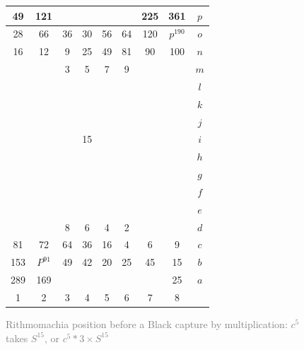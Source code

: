 \documentclass[12pt]{article}
\begin{document}
\begin{figure}[h!] 
\centering 
\begin{tabular}{|c|c|c|c|c|c|c|c||c} \hline
\squadfill{\,}49 & \squadfill{\,}121 & \quad  & \quad  & \quad  & \quad  & \squadfill{\,}225 & \squadfill{\,}361 & $p$ \\ \hline
\squadfill{\,}28 & \squadfill{\,}66 & \trianglepafill{\,}36 & \trianglepafill{\,}30 & \trianglepafill{\,}56 & \trianglepafill{\,}64 & \squadfill{\,}120 & \rhombusfill{\,}$p^{190}$ & $o$ \\ \hline
\trianglepafill{\,}16 & \trianglepafill{\,}12 & \circletfill{\,}9 & \circletfill{\,}25 & \circletfill{\,}49 & \circletfill{\,}81 & \trianglepafill{\,}90 & \trianglepafill{\,}100 & $n$ \\ \hline
\quad  & \quad  & \circletfill{\,}3 & \circletfill{\,}5 & \circletfill{\,}7 & \circletfill{\,}9 & \quad  & \quad  & $m$ \\ \hline
\quad  & \quad  & \quad  & \quad  & \quad  & \quad  & \quad  & \quad  & $l$ \\ \hline
\quad  & \quad  & \quad  & \quad  & \quad  & \quad  & \quad  & \quad  & $k$ \\ \hline
\quad  & \quad  & \quad  & \quad  & \quad  & \quad  & \quad  & \quad  & $j$ \\ \hline
\quad  & \quad  & \quad  & \squad{\,}15 & \quad  & \quad  & \quad  & \quad  & $i$ \\ \hline
\quad  & \quad  & \quad  & \quad  & \quad  & \quad  & \quad  & \quad  & $h$ \\ \hline
\quad  & \quad  & \quad  & \quad  & \quad  & \quad  & \quad  & \quad  & $g$ \\ \hline
\quad  & \quad  & \quad  & \quad  & \quad  & \quad  & \quad  & \quad  & $f$ \\ \hline
\quad  & \quad  & \quad  & \quad  & \quad  & \quad  & \quad  & \quad  & $e$ \\ \hline
\quad  & \quad  & \circlet{\,}8 & \circlet{\,}6 & \circlet{\,}4 & \circlet{\,}2 & \quad  & \quad  & $d$ \\ \hline
\trianglepa{\,}81 & \trianglepa{\,}72 & \circlet{\,}64 & \circlet{\,}36 & \circlet{\,}16 & \circlet{\,}4 & \trianglepa{\,}6 & \trianglepa{\,}9 & $c$ \\ \hline
\squad{\,}153 & \rhombus{\,}$P^{91}$ & \trianglepa{\,}49 & \trianglepa{\,}42 & \trianglepa{\,}20 & \trianglepa{\,}25 & \squad{\,}45 & \squad{\,}15 & $b$ \\ \hline
\squad{\,}289 & \squad{\,}169 & \quad  & \quad  & \quad  & \quad  & \quad  & \squad{\,}25 & $a$ \\ \hline
1 &  2 &  3 &  4 &  5 &  6 &  7 &  8  &  \\
\end{tabular} 
\caption{\textcolor{gray}{Rithmomachia position before a Black capture by multiplication: $c^5$ takes $S^{15}$, or $c^5*3\times S^{15}$}}
\label{fig:rithmomachia-capture-by-multiplication-division-with-pyramid} 
\end{figure}
\end{document}
